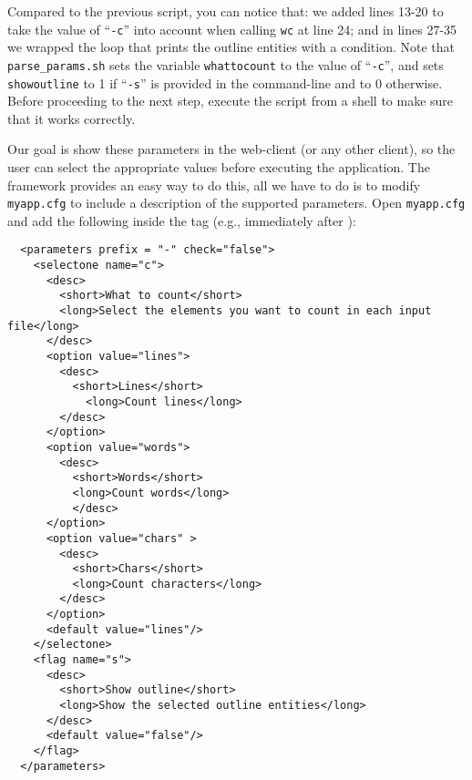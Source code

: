\medskip
\noindent
Compared to the previous script, you can notice that: we added lines
13-20 to take the value of ``\texttt{-c}'' into account when calling
\texttt{wc} at line 24; and in lines 27-35 we wrapped the loop that
prints the outline entities with a condition.
%
Note that \texttt{parse\_params.sh} sets the variable
\texttt{whattocount} to the value of ``\texttt{-c}'', and sets
\texttt{showoutline} to 1 if ``\texttt{-s}'' is provided in the
command-line and to 0 otherwise. Before proceeding to the next step,
execute the script from a shell to make sure that it works correctly.

Our goal is show these parameters in the web-client (or any other
client), so the user can select the appropriate values before
executing the application. The \ei framework provides an easy way to
do this, all we have to do is to modify \texttt{myapp.cfg} to include
a description of the supported parameters. Open \texttt{myapp.cfg} and
add the following inside the  tag (e.g., immediately after
):

\medskip
\begin{lstlisting}
  <parameters prefix = "-" check="false">
    <selectone name="c">
      <desc>
        <short>What to count</short>
        <long>Select the elements you want to count in each input file</long>
      </desc>
      <option value="lines">
        <desc>
          <short>Lines</short>
            <long>Count lines</long>
        </desc>
      </option>
      <option value="words">
        <desc>
          <short>Words</short>
          <long>Count words</long>
          </desc>
      </option>
      <option value="chars" >
        <desc>
          <short>Chars</short>
          <long>Count characters</long>
        </desc>
      </option>
      <default value="lines"/>
    </selectone>
    <flag name="s">
      <desc>
        <short>Show outline</short>
        <long>Show the selected outline entities</long>
      </desc>
      <default value="false"/>
    </flag>
  </parameters>
\end{lstlisting}

